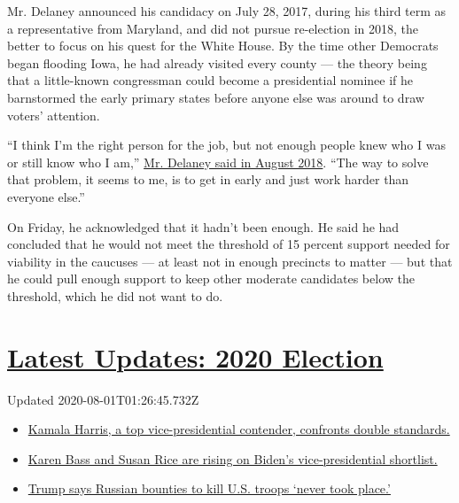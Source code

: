 Mr. Delaney announced his candidacy on July 28, 2017, during his third
term as a representative from Maryland, and did not pursue re-election
in 2018, the better to focus on his quest for the White House. By the
time other Democrats began flooding Iowa, he had already visited every
county --- the theory being that a little-known congressman could become
a presidential nominee if he barnstormed the early primary states before
anyone else was around to draw voters' attention.

``I think I'm the right person for the job, but not enough people knew
who I was or still know who I am,''
\href{https://www.nytimes.com/2018/11/10/us/politics/john-delaney-2020-iowa.html}{Mr.
Delaney said in August 2018}. ``The way to solve that problem, it seems
to me, is to get in early and just work harder than everyone else.''

On Friday, he acknowledged that it hadn't been enough. He said he had
concluded that he would not meet the threshold of 15 percent support
needed for viability in the caucuses --- at least not in enough
precincts to matter --- but that he could pull enough support to keep
other moderate candidates below the threshold, which he did not want to
do.

\hypertarget{latest-updates-2020-election}{%
\section{\texorpdfstring{\href{https://www.nytimes.com/2020/07/31/us/elections/biden-vs-trump.html?action=click\&pgtype=Article\&state=default\&region=MAIN_CONTENT_1\&context=storylines_live_updates}{Latest
Updates: 2020
Election}}{Latest Updates: 2020 Election}}\label{latest-updates-2020-election}}

Updated 2020-08-01T01:26:45.732Z

\begin{itemize}
\tightlist
\item
  \href{https://www.nytimes.com/2020/07/31/us/elections/biden-vs-trump.html?action=click\&pgtype=Article\&state=default\&region=MAIN_CONTENT_1\&context=storylines_live_updates\#link-29fdff45}{Kamala
  Harris, a top vice-presidential contender, confronts double
  standards.}
\item
  \href{https://www.nytimes.com/2020/07/31/us/elections/biden-vs-trump.html?action=click\&pgtype=Article\&state=default\&region=MAIN_CONTENT_1\&context=storylines_live_updates\#link-13ec3d9c}{Karen
  Bass and Susan Rice are rising on Biden's vice-presidential
  shortlist.}
\item
  \href{https://www.nytimes.com/2020/07/31/us/elections/biden-vs-trump.html?action=click\&pgtype=Article\&state=default\&region=MAIN_CONTENT_1\&context=storylines_live_updates\#link-49e9a016}{Trump
  says Russian bounties to kill U.S. troops `never took place.'}
\end{itemize}

